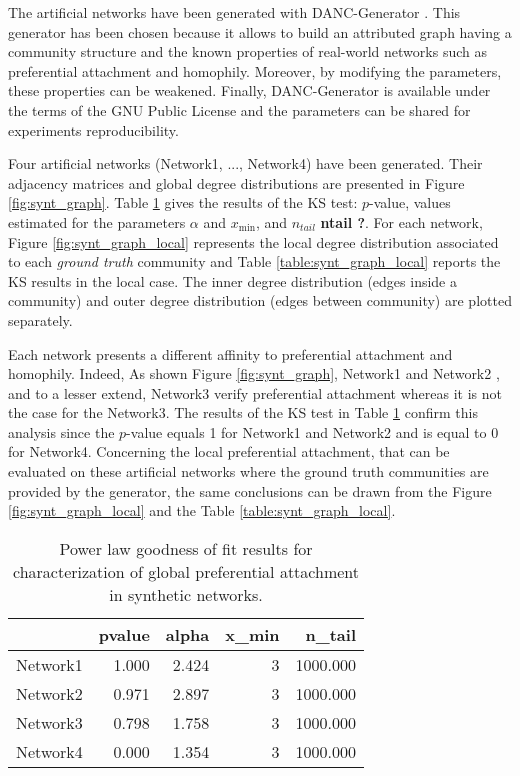 \documentclass[a4paper, 12pt]{article}
\begin{document}
The artificial networks have been generated with DANC-Generator \cite{largeron2015}. This generator has been chosen because it allows to build an attributed graph having a community structure  and  the known properties of real-world networks such as preferential attachment and homophily.
Moreover, by modifying the parameters, these properties can be weakened. Finally, DANC-Generator is available under the terms of the GNU Public License and the        parameters can be shared for experiments reproducibility.

Four artificial networks (Network1, ..., Network4) have been generated.  Their adjacency matrices and global degree distributions are presented in Figure \ref{fig:synt_graph}. Table \ref{table:synt_graph} gives the results of the KS test: $p$-value, values estimated for the parameters  $\alpha$ and $x_\text{min}$,  and $n_{tail}$ \textbf{ntail ?}. For each network, Figure \ref{fig:synt_graph_local} represents the local degree distribution associated to each \emph{ground truth} community and Table \ref{table:synt_graph_local} reports the KS results in the local case. The inner degree distribution (edges inside a community) and outer degree distribution (edges between community) are plotted separately.

Each network presents a different affinity to preferential attachment and homophily.
Indeed, As shown Figure \ref{fig:synt_graph}, Network1 and Network2 , and to a lesser extend, Network3 verify preferential attachment whereas it is not the case for the Network3. The results of the KS test in Table \ref{table:synt_graph} confirm this analysis since the $p$-value equals 1 for Network1 and Network2 and is equal to 0 for Network4.
Concerning the local preferential attachment, that can be evaluated on these artificial networks where the ground truth communities are provided by the generator, the same conclusions can be drawn from the Figure \ref{fig:synt_graph_local} and the Table \ref{table:synt_graph_local}.




\begin{table}[h]
\caption{Power law goodness of fit results for characterization of global preferential attachment in synthetic networks.}
\centering
    \begin{tabular}{lrrrr}
    \hline
               &   pvalue &   alpha &   x\_min &   n\_tail \\
    \hline
     Network1 &    1.000 &   2.424 &       3 & 1000.000 \\
     Network2 &    0.971 &   2.897 &       3 & 1000.000 \\
     Network3 &    0.798 &   1.758 &       3 & 1000.000 \\
     Network4 &    0.000 &   1.354 &       3 & 1000.000 \\
    \hline
    \end{tabular}
\label{table:synt_graph}
\end{table}
\end{document}
